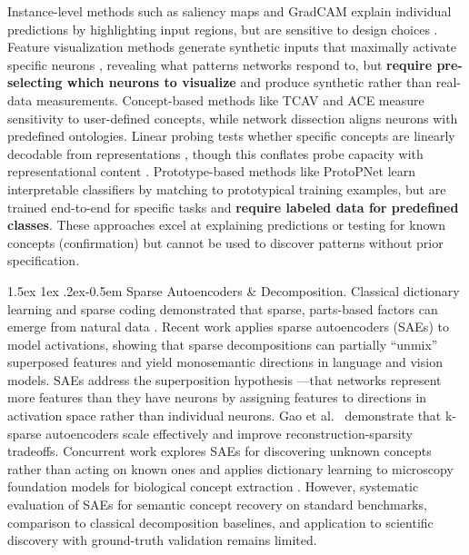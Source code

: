 \documentclass[10pt,twocolumn,letterpaper]{article}
\makeatletter
\renewcommand{\paragraph}{%
  \@startsection{paragraph}{4}%
  {\z@}{1.5ex \@plus 1ex \@minus .2ex}{-0.5em}%
  {\normalfont\normalsize\bfseries}%
}
\makeatother
\begin{document}
Instance-level methods such as saliency maps and GradCAM \citep{simonyan2014deep,selvaraju2017gradcam} explain individual predictions by highlighting input regions, but are sensitive to design choices \citep{adebayo2018sanity,sturmfels2020visualizing}.
Feature visualization methods generate synthetic inputs that maximally activate specific neurons \citep{olah2017feature,mordvintsev2015deepdream}, revealing what patterns networks respond to, but \textbf{require pre-selecting which neurons to visualize} and produce synthetic rather than real-data measurements.
Concept-based methods like TCAV and ACE \citep{kim2018tcav,ghorbani2019ace} measure sensitivity to user-defined concepts, while network dissection \citep{bau2017network} aligns neurons with predefined ontologies.
Linear probing tests whether specific concepts are linearly decodable from representations \citep{alain2016understanding}, though this conflates probe capacity with representational content \citep{hewitt2019probes,belinkov2022probing}.
Prototype-based methods like ProtoPNet \citep{chen2019protopnet} learn interpretable classifiers by matching to prototypical training examples, but are trained end-to-end for specific tasks and \textbf{require labeled data for predefined classes}.
These approaches excel at explaining predictions or testing for known concepts (confirmation) but cannot be used to discover patterns without prior specification.

\paragraph{Sparse Autoencoders \& Decomposition.}
Classical dictionary learning and sparse coding demonstrated that sparse, parts-based factors can emerge from natural data \citep{olshausen1996nature,aharon2006ksvd,lee1999nmf}.
Recent work applies sparse autoencoders (SAEs) to model activations, showing that sparse decompositions can partially ``unmix'' superposed features and yield monosemantic directions \citep{elhage2022superposition,bricken2023monosemantic,gao2024scaling} in language and vision models.
SAEs address the superposition hypothesis \citep{elhage2022superposition}—that networks represent more features than they have neurons by assigning features to directions in activation space rather than individual neurons.
Gao et al.\ \citep{gao2024scaling} demonstrate that k-sparse autoencoders scale effectively and improve reconstruction-sparsity tradeoffs.
Concurrent work explores SAEs for discovering unknown concepts rather than acting on known ones \citep{peng2025use} and applies dictionary learning to microscopy foundation models for biological concept extraction \citep{zimmermann2024scientific}.
However, systematic evaluation of SAEs for semantic concept recovery on standard benchmarks, comparison to classical decomposition baselines, and application to scientific discovery with ground-truth validation remains limited.
\end{document}
